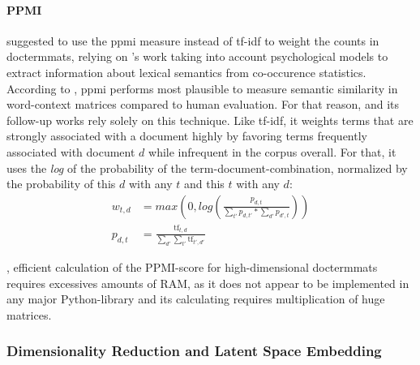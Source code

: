 
\paragraph{PPMI}

\textcite{Turney2010} suggested to use the \gls{ppmi} measure instead of \gls{tf-idf} to weight the counts in \glspl{doctermmat}, relying on \cite{Bullinaria2007}'s work taking into account psychological models to extract information about lexical semantics from co-occurence statistics. According to \cite{Turney2010,Bullinaria2007}, \gls{ppmi} performs most plausible to measure semantic similarity in word-context matrices compared to human evaluation. For that reason, \textcite{Derrac2015} and its follow-up works \cite{Ager2018,Alshaikh2020} rely solely on this technique. %
Like tf-idf, it weights terms that are strongly associated with a document highly by favoring terms frequently associated with document $d$ while infrequent in the corpus overall. For that, it uses the \textit{log} of the probability of the term-document-combination, normalized by the probability of this $d$ with any $t$ and this $t$ with any $d$:
\vspace{-2.5ex}
\begin{align*}
   w_{t,d} &= max\left(0, log\left( \frac{p_{d,t}}{\sum_{t'}p_{d,t'}*\sum_{d'}p_{d',t}} \right) \right) \\
   p_{d,t} &= \frac{\text{tf}_{t,d}}{\sum_{d'}\sum_{t'} \text{tf}_{t',d'}}
\end{align*}

, efficient calculation of the PPMI-score for high-dimensional \glspl{doctermmat} requires excessives amounts of RAM, as it does not appear to be implemented in any major Python-library and its calculating requires multiplication of huge matrices.


\subsubsection{Dimensionality Reduction and Latent Space Embedding}
\label{sec:dim_red}

